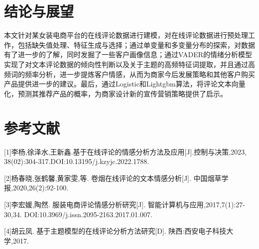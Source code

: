 \documentclass[
  journal=medium,
  manuscript=article-type,
  year=2023,
  volume=37,
]{cup-journal}
\begin{document}
~\\
~\\
~\\
~\\
~\\
~\\
~\\

\section{结论与展望}

本文针对某女装电商平台的在线评论数据进行建模，对在线评论数据进行预处理工作，包括缺失值处理、特征生成与选择；通过单变量和多变量分布的探索，对数据有了进一步的了解，同时发掘了一些客户画像信息；通过VADER的情绪分析模型实现了对文本评论数据的倾向性判断以及关于主题的高频特征词提取，并且通过高频词的频率分析，进一步提炼客户情感，从而为商家今后发展策略和其他客户购买产品提供进一步的建议。最后，通过Logistic和Lightgbm算法，将评论文本向量化，预测其推荐产品的概率，为商家设计新的宣传营销策略提供了启示。

\section{参考文献}

[1]李杨,徐泽水,王新鑫.基于在线评论的情感分析方法及应用[J].控制与决策,2023,
38(02):304-317.DOI:10.13195/j.kzyjc.2022.1788.

[2]杨春晓,张鹤馨,黄家雯,等. 卷烟在线评论的文本情感分析[J]. 中国烟草学报,2020,26(2):92-100. 

[3]李宏媛,陶然. 服装电商评论情感分析研究[J]. 智能计算机与应用,2017,7(1):27-30,34. DOI:10.3969/j.issn.2095-2163.2017.01.007. 

[4]胡云凤. 基于主题模型的在线评论分析方法研究[D]. 陕西:西安电子科技大学,2017.
\end{document}
